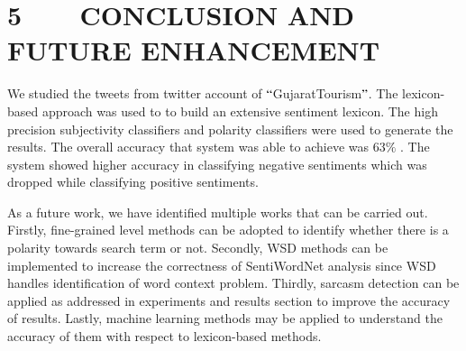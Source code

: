 \documentclass[12pt]{article}
\begin{document}
\section*{5\ \ \ \  CONCLUSION AND FUTURE ENHANCEMENT}
\begin{justify}
We studied the tweets from twitter account of $``$GujaratTourism$"$. The lexicon-based approach was used to to build an extensive sentiment lexicon. The high precision subjectivity classifiers and polarity classifiers were used to generate the results. The overall accuracy that system was able to achieve was 63$\%$ . The system showed higher accuracy in classifying negative sentiments which was dropped while classifying positive sentiments. 
\end{justify}\par

\begin{justify}
As a future work, we have identified multiple works that can be carried out. Firstly, fine-grained level methods can be adopted to identify whether there is a polarity towards search term or not. Secondly, WSD methods can be implemented to increase the correctness of SentiWordNet analysis since WSD handles identification of word context problem. Thirdly, sarcasm detection can be applied as addressed in experiments and results section to improve the accuracy of results. Lastly, machine learning methods may be applied to understand the accuracy of them with respect to lexicon-based methods.
\end{justify}\par

\begin{justify}
 
\end{justify}\par
\end{document}
